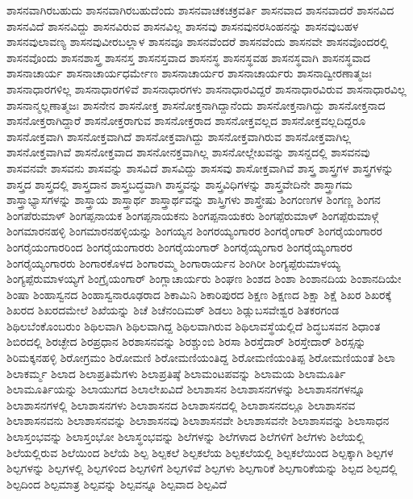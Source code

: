 {ಶಾಸನವಾಗಿರಬಹುದು
ಶಾಸನವಾಗಿರಬಹುದೆಂದು
ಶಾಸನವಾಚಕಚಕ್ರವರ್ತಿ
ಶಾಸನವಾದ
ಶಾಸನವಾದರೆ
ಶಾಸನವಿದ
ಶಾಸನವಿದೆ
ಶಾಸನವಿದ್ದು
ಶಾಸನವಿರುವ
ಶಾಸನವಿಲ್ಲ
ಶಾಸನವು
ಶಾಸನವುನರಸಿಂಹನನ್ನು
ಶಾಸನವುಬಹಳ
ಶಾಸನವುಲಾವಣ್ಯ
ಶಾಸನವುವೀರಬಲ್ಲಾಳ
ಶಾಸನವೂ
ಶಾಸನವೆಂದರೆ
ಶಾಸನವೆಂದು
ಶಾಸನವೇ
ಶಾಸನವೊಂದರಲ್ಲಿ
ಶಾಸನವೊಂದು
ಶಾಸನಶಾಸ್ತ್ರ
ಶಾಸನಸ್ತ
ಶಾಸನಸ್ತವಾದ
ಶಾಸನಸ್ಥ
ಶಾಸನಸ್ಥವಹ
ಶಾಸನಸ್ಥವಾಗಿ
ಶಾಸನಸ್ಥವಾದ
ಶಾಸನಾಚಾರ್ಯ
ಶಾಸನಾಚಾರ್ಯಧರ್ಮೇಣ
ಶಾಸನಾಚಾರ್ಯರ
ಶಾಸನಾಚಾರ್ಯರು
ಶಾಸನಾದ್ವೀರಣಾತ್ಮಜಃ
ಶಾಸನಾಧಾರಗಳಿಲ್ಲ
ಶಾಸನಾಧಾರಗಳಿವೆ
ಶಾಸನಾಧಾರಗಳು
ಶಾಸನಾಧಾರವಿದ್ದರೆ
ಶಾಸನಾಧಾರವಿರುವ
ಶಾಸನಾಧಾರವಿಲ್ಲ
ಶಾಸನಾನ್ಮಲ್ಲಣಾತ್ಮಜಃ
ಶಾಸನೇನ
ಶಾಸನೋಕ್ತ
ಶಾಸನೋಕ್ತನಾಗಿದ್ದಾನೆಂದು
ಶಾಸನೋಕ್ತನಾಗಿದ್ದು
ಶಾಸನೋಕ್ತನಾದ
ಶಾಸನೋಕ್ತರಾಗಿದ್ದಾರೆ
ಶಾಸನೋಕ್ತರಾಗುವ
ಶಾಸನೋಕ್ತರಾದ
ಶಾಸನೋಕ್ತವಲ್ಲದ
ಶಾಸನೋಕ್ತವಲ್ಲದಿದ್ದರೂ
ಶಾಸನೋಕ್ತವಾಗಿ
ಶಾಸನೋಕ್ತವಾಗಿದೆ
ಶಾಸನೋಕ್ತವಾಗಿದ್ದು
ಶಾಸನೋಕ್ತವಾಗಿರುವ
ಶಾಸನೋಕ್ತವಾಗಿಲ್ಲ
ಶಾಸನೋಕ್ತವಾಗಿವೆ
ಶಾಸನೋಕ್ತವಾದ
ಶಾಸನೋನಕ್ತವಾಗಿಲ್ಲ
ಶಾಸನೋಲ್ಲೇಖವನ್ನು
ಶಾಸನ್ದದಲ್ಲಿ
ಶಾಸವನವು
ಶಾಸವನವೇ
ಶಾಸವನು
ಶಾಸವನ್ನು
ಶಾಸವಿದೆ
ಶಾಸವಿದ್ದು
ಶಾಸಸವು
ಶಾಸೋಕ್ತವಾಗಿವೆ
ಶಾಸ್ತ್ರ
ಶಾಸ್ತ್ರಗಳ
ಶಾಸ್ತ್ರಗಳನ್ನು
ಶಾಸ್ತ್ರದ
ಶಾಸ್ತ್ರದಲ್ಲಿ
ಶಾಸ್ತ್ರದಾನ
ಶಾಸ್ತ್ರಬದ್ಧವಾಗಿ
ಶಾಸ್ತ್ರವನ್ನು
ಶಾಸ್ತ್ರವಿಧಿಗಳನ್ನು
ಶಾಸ್ತ್ರವೇದಿನೇ
ಶಾಸ್ತ್ರಾಗಮ
ಶಾಸ್ತ್ರಾಭ್ಯಾಸಗಳನ್ನು
ಶಾಸ್ತ್ರಾಯ
ಶಾಸ್ತ್ರಾರ್ಥ
ಶಾಸ್ತ್ರಾರ್ಥವನ್ನು
ಶಾಸ್ತ್ರಿಗಳು
ಶಾಸ್ತ್ರೇಷು
ಶಿಂಗಂಣಗಳ
ಶಿಂಗಣ್ಣ
ಶಿಂಗನ
ಶಿಂಗಪೆರುಮಾಳ್
ಶಿಂಗಪ್ಪನಾಯಕ
ಶಿಂಗಪ್ಪನಾಯಕನು
ಶಿಂಗಪ್ಪನಾಯಕರು
ಶಿಂಗಪ್ಪೆರುಮಾಳ್
ಶಿಂಗಪ್ಪೆರುಮಾಳ್ಗೆ
ಶಿಂಗಮಾರನಹಳ್ಳಿ
ಶಿಂಗಮಾರನಹಳ್ಳಿಯನ್ನು
ಶಿಂಗಯ್ಯನ
ಶಿಂಗರಯ್ಯಂಗಾರರ
ಶಿಂಗರೈಂಗಾರ್
ಶಿಂಗರೈಯಂಗಾರರ
ಶಿಂಗರೈಯಂಗಾರರಿಂದ
ಶಿಂಗರೈಯಂಗಾರರು
ಶಿಂಗರೈಯಂಗಾರ್
ಶಿಂಗರೈಯ್ಯಂಗಾರ
ಶಿಂಗರೈಯ್ಯಂಗಾರರ
ಶಿಂಗರೈಯ್ಯಂಗಾರರು
ಶಿಂಗಾರಕೊಳದ
ಶಿಂಗಾರಮ್ಮ
ಶಿಂಗಾರಾರ್ಯನ
ಶಿಂಗಿರೀ
ಶಿಂಗ್ಯಪ್ಪೆರುಮಾಳಯ್ಯ
ಶಿಂಗ್ಯಪ್ಪೆರುಮಾಳಯ್ಯಗೆ
ಶಿಂಗ್ರೈಯಂಗಾರ್
ಶಿಂಗ್ಲಾಚಾರ್ಯರು
ಶಿಂಘಣ
ಶಿಂಶದ
ಶಿಂಶಾ
ಶಿಂಶಾನದಿಯ
ಶಿಂಶಾನದಿಯೇ
ಶಿಂಷಾ
ಶಿಂಹಾಸ್ವನದ
ಶಿಂಹಾಸ್ವನಾರೂಢರಾದ
ಶಿಕಾಮಿನಿ
ಶಿಕಾರಿಪುರದ
ಶಿಕ್ಷಣ
ಶಿಕ್ಷಣದ
ಶಿಕ್ಷಾ
ಶಿಕ್ಷೆ
ಶಿಖರ
ಶಿಖರಕ್ಕೆ
ಶಿಖರದ
ಶಿಖರದಮೇಲೆ
ಶಿಖೆಯನ್ನು
ಶಿಚೆ
ಶಿಚೆನಂದಿಮಠ್
ಶಿಡಲು
ಶಿಡ್ಲುಬಸವೇಶ್ವರ
ಶಿತಕರಗಂಡ
ಶಿಥಿಲಬೆಂಕೊಂಬರುಂ
ಶಿಥಿಲವಾಗಿ
ಶಿಥಿಲವಾಗಿದ್ದ
ಶಿಥಿಲವಾಗಿರುವ
ಶಿಥಿಲಾವಸ್ಥೆಯಲ್ಲಿದೆ
ಶಿದ್ಧಬಸವನ
ಶಿಧಾಂತ
ಶಿಬಿರದಲ್ಲಿ
ಶಿರಚ್ಛೇದ
ಶಿರಪ್ರಧಾನ
ಶಿರಶಾಸನವನ್ನು
ಶಿರಶ್ಚುಂಬಿ
ಶಿರಸಾ
ಶಿರಸ್ತೆದಾರ್
ಶಿರಸ್ತೇದಾರ್
ಶಿರಸ್ಸನ್ನು
ಶಿರಿಮಕ್ಕನಹಳ್ಳಿ
ಶಿರೋಗ್ರಮಂ
ಶಿರೋಮಣಿ
ಶಿರೋಮಣಿಯಂತಿದ್ದ
ಶಿರೋಮಣಿಯಂತಿಪ್ಪ
ಶಿರೋಮಣಿಯಂತೆ
ಶಿಲಾ
ಶಿಲಾಕರ್ಮ್ಮ
ಶಿಲಾದ
ಶಿಲಾಪ್ರತಿಮೆಗಳು
ಶಿಲಾಪ್ರತಿಷ್ಠೆ
ಶಿಲಾಮಂಟಪವನ್ನು
ಶಿಲಾಮಯ
ಶಿಲಾಮೂರ್ತಿ
ಶಿಲಾಮೂರ್ತಿಯನ್ನು
ಶಿಲಾಯುಗದ
ಶಿಲಾಲೇಖವಿದೆ
ಶಿಲಾಶಾಸನ
ಶಿಲಾಶಾಸನಗಳನ್ನು
ಶಿಲಾಶಾಸನಗಳನ್ನೂ
ಶಿಲಾಶಾಸನಗಳಲ್ಲಿ
ಶಿಲಾಶಾಸನಗಳು
ಶಿಲಾಶಾಸನದ
ಶಿಲಾಶಾಸನದಲ್ಲಿ
ಶಿಲಾಶಾಸನದಲ್ಲೂ
ಶಿಲಾಶಾಸನವ
ಶಿಲಾಶಾಸನವನು
ಶಿಲಾಶಾಸನವನ್ನು
ಶಿಲಾಶಾಸನವು
ಶಿಲಾಶಾಸನವೇ
ಶಿಲಾಶಾಸವನೇ
ಶಿಲಾಶಾಸವನ್ನು
ಶಿಲಾಸಾಧನ
ಶಿಲಾಸ್ತಂಭವನ್ನು
ಶಿಲಾಸ್ತಂಭೋ
ಶಿಲಾಸ್ಥಂಭವನ್ನು
ಶಿಲೆಗಳನ್ನು
ಶಿಲೆಗಳಾದ
ಶಿಲೆಗಳಿಗೆ
ಶಿಲೆಗಳು
ಶಿಲೆಯಲ್ಲಿ
ಶಿಲೆಯಲ್ಲಿರುವ
ಶಿಲೆಯಿಂದ
ಶಿಲೆಯೆ
ಶಿಲ್ಪ
ಶಿಲ್ಪಕಲೆ
ಶಿಲ್ಪಕಲೆಯ
ಶಿಲ್ಪಕಲೆಯಲ್ಲಿ
ಶಿಲ್ಪಕಲೆಯಿಂದ
ಶಿಲ್ಪಕ್ಕಾಗಿ
ಶಿಲ್ಪಗಳ
ಶಿಲ್ಪಗಳನ್ನು
ಶಿಲ್ಪಗಳಲ್ಲಿ
ಶಿಲ್ಪಗಳಿಂದ
ಶಿಲ್ಪಗಳಿಗೆ
ಶಿಲ್ಪಗಳಿವೆ
ಶಿಲ್ಪಗಳು
ಶಿಲ್ಪಗಾರಿಕೆ
ಶಿಲ್ಪಗಾರಿಕೆಯನ್ನು
ಶಿಲ್ಪದ
ಶಿಲ್ಪದಲ್ಲಿ
ಶಿಲ್ಪದಿಂದ
ಶಿಲ್ಪಮಾತ್ರ
ಶಿಲ್ಪವನ್ನು
ಶಿಲ್ಪವನ್ನೂ
ಶಿಲ್ಪವಾದ
ಶಿಲ್ಪವಿದೆ
}
